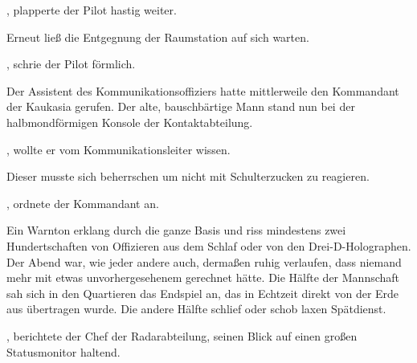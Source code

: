 , plapperte der Pilot hastig weiter. 

\par

Erneut ließ die Entgegnung der Raumstation auf sich warten. 

\par

, schrie der Pilot förmlich. 

\par

Der Assistent des Kommunikationsoffiziers hatte mittlerweile den Kommandant der Kaukasia gerufen. Der alte, bauschbärtige Mann stand nun bei der halbmondförmigen Konsole der Kontaktabteilung.

\par

, wollte er vom Kommunikationsleiter wissen.

\par

Dieser musste sich beherrschen um nicht mit Schulterzucken zu reagieren. 

\par

, ordnete der Kommandant an.

\par

Ein Warnton erklang durch die ganze Basis und riss mindestens zwei Hundertschaften von Offizieren aus dem Schlaf oder von den Drei-D-Holographen. Der Abend war, wie jeder andere auch, dermaßen ruhig verlaufen, dass niemand mehr mit etwas unvorhergesehenem gerechnet hätte. Die Hälfte der Mannschaft sah sich in den Quartieren das Endspiel an, das in Echtzeit direkt von der Erde aus übertragen wurde. Die andere Hälfte schlief oder schob laxen Spätdienst.

\par

, berichtete der Chef der Radarabteilung, seinen Blick auf einen großen Statusmonitor haltend. 

